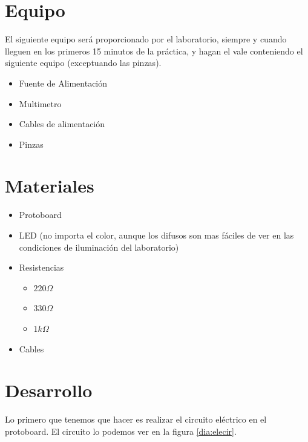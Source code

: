 \section{Equipo}

	El siguiente equipo será proporcionado por el laboratorio, siempre y cuando lleguen en los primeros 15 minutos de la práctica, y hagan el vale conteniendo el siguiente equipo (exceptuando las pinzas).

	\begin{itemize}
		\item Fuente de Alimentación
		\item Multimetro
		\item Cables de alimentación
		\item Pinzas
	\end{itemize}


\section{Materiales}

	\begin{itemize}
		\item Protoboard
		\item LED (no importa el color, aunque los difusos son mas fáciles de ver en las condiciones de iluminación del laboratorio)
		\item Resistencias
		\begin{itemize}
			\item $220 \Omega$
			\item $330 \Omega$
			\item $1 k\Omega$
		\end{itemize}
		\item Cables
	\end{itemize}


\section{Desarrollo}

    Lo primero que tenemos que hacer es realizar el circuito eléctrico en el protoboard. El circuito lo podemos ver en la figura \ref{dia:elecir}. \\

